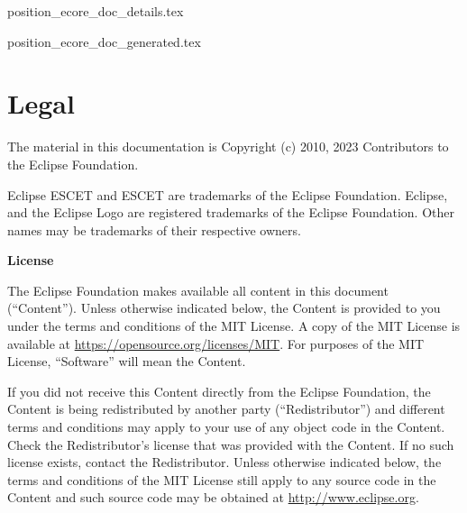\documentclass{report}
\begin{document}
\newpage


       {position_ecore_doc_details.tex}



       {position_ecore_doc_generated.tex}



\chapter{Legal}

The material in this documentation is
Copyright (c) 2010, 2023 Contributors to the Eclipse Foundation.

Eclipse ESCET and ESCET are trademarks of the Eclipse Foundation.
Eclipse, and the Eclipse Logo are registered trademarks of the
Eclipse Foundation. Other names may be trademarks of their
respective owners.

\textbf{License}

The Eclipse Foundation makes available all content in this document
(``Content''). Unless otherwise indicated below, the Content is provided to you
under the terms and conditions of the MIT License. A copy of the MIT License
is available at \url{https://opensource.org/licenses/MIT}. For purposes of the
MIT License, ``Software'' will mean the Content.

If you did not receive this Content directly from the Eclipse Foundation,
the Content is being redistributed by another party (``Redistributor'') and
different terms and conditions may apply to your use of any object code in
the Content. Check the Redistributor's license that was provided with the
Content. If no such license exists, contact the Redistributor. Unless
otherwise indicated below, the terms and conditions of the MIT License
still apply to any source code in the Content and such source code may be
obtained at \url{http://www.eclipse.org}.





\end{document}
